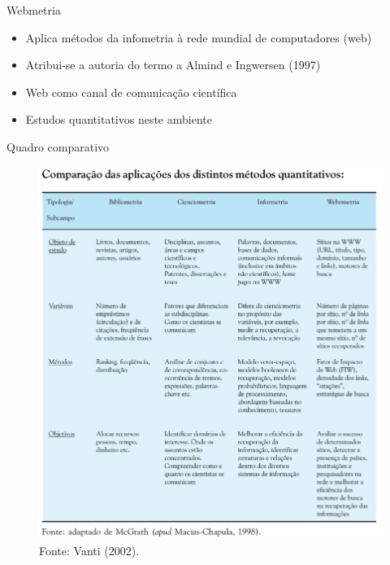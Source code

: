 \begin{frame}{Webmetria}
\begin{itemize}
\item Aplica métodos da infometria à rede mundial de computadores (web)
\item Atribui-se a autoria do termo a Almind e Ingwersen (1997)
\item Web como canal de comunicação científica 
\item Estudos quantitativos neste ambiente
\end{itemize}
\end{frame}

\begin{frame}{Quadro comparativo}
\begin{figure}
\centering
\includegraphics[scale=0.2]{figs/03/quadro-metricas}
\caption{Fonte: Vanti (2002).}
\end{figure}
\end{frame}

